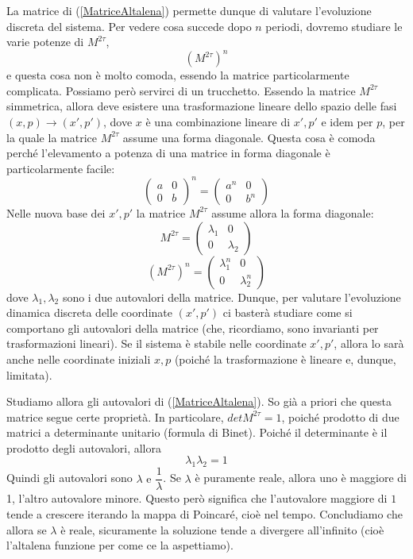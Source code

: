 \documentclass[a4paper,openany]{article}
\begin{document}
	
	La matrice di (\ref{MatriceAltalena}) permette dunque di valutare l'evoluzione discreta del sistema. Per vedere cosa succede dopo $n$ periodi, dovremo studiare le varie potenze di $M^{2\tau}$,
	$$
	(M^{2\tau})^{n}
	$$
	e questa cosa non è molto comoda, essendo la matrice particolarmente complicata. Possiamo però servirci di un trucchetto. Essendo la matrice $M^{2\tau}$ simmetrica, allora deve esistere una trasformazione lineare dello spazio delle fasi $(x,p)\to(x',p')$, dove $x$ è una combinazione lineare di $x',p'$ e idem per $p$, per la quale la matrice $M^{2\tau}$ assume una forma diagonale. Questa cosa è comoda perché l'elevamento a potenza di una matrice in forma diagonale è particolarmente facile:
	\begin{equation}\label{key}
		\begin{pmatrix}
			a & 0 \\
			0 & b
		\end{pmatrix}^{n} = 
		\begin{pmatrix}
			a^n & 0 \\
			0 & b^n
		\end{pmatrix}
	\end{equation}
	Nelle nuova base dei $x',p'$ la matrice $M^{2\tau}$ assume allora la forma diagonale:
	\begin{equation}\label{key}
		M^{2\tau} =
		\begin{pmatrix}
			\lambda_1 & 0 \\
			0 & \lambda_2
		\end{pmatrix}
	\end{equation}
	\begin{equation}\label{key}
		(M^{2\tau})^{n} =
		\begin{pmatrix}
			\lambda_1^n & 0 \\
			0 & \lambda_2^n
		\end{pmatrix}
	\end{equation}
	dove $\lambda_{1},\lambda_{2}$ sono i due autovalori della matrice. Dunque, per valutare l'evoluzione dinamica discreta delle coordinate $(x',p')$ ci basterà studiare come si comportano gli autovalori della matrice (che, ricordiamo, sono invarianti per trasformazioni lineari). Se il sistema è stabile nelle coordinate $x',p'$, allora lo sarà anche nelle coordinate iniziali $x,p$ (poiché la trasformazione è lineare e, dunque, limitata).
	
	Studiamo allora gli autovalori di (\ref{MatriceAltalena}). So già a priori che questa matrice segue certe proprietà. In particolare, $detM^{2\tau} = 1$, poiché prodotto di due matrici a determinante unitario (formula di Binet). Poiché il determinante è il prodotto degli autovalori, allora
	$$
	\lambda_{1} \lambda_{2} = 1
	$$
	Quindi gli autovalori sono $\lambda \mbox{ e } \dfrac{1}{\lambda}$. Se $\lambda$ è puramente reale, allora uno è maggiore di 1, l'altro autovalore minore. Questo però significa che l'autovalore maggiore di $1$ tende a crescere iterando la mappa di Poincaré, cioè nel tempo. Concludiamo che allora se $\lambda$ è reale, sicuramente la soluzione tende a divergere all'infinito (cioè l'altalena funzione per come ce la aspettiamo).
	
\end{document}
